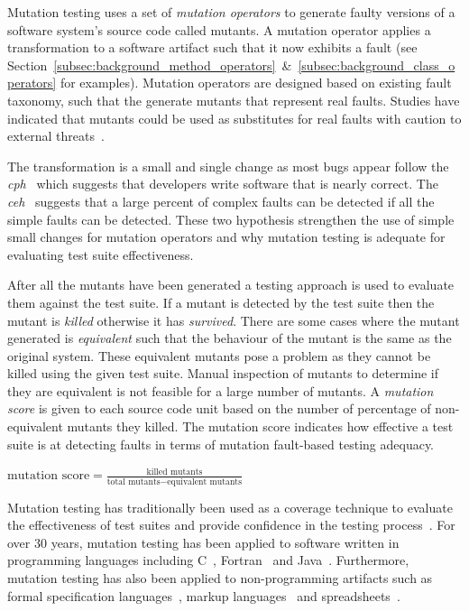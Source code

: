 Mutation testing uses a set of \emph{mutation operators} to generate faulty versions of a software system's source code called mutants. A mutation operator applies a transformation to a software artifact such that it now exhibits a fault (see Section~\ref{subsec:background_method_operators}~\&~\ref{subsec:background_class_operators} for examples). Mutation operators are designed based on existing fault taxonomy, such that the generate mutants that represent real faults. Studies have indicated that mutants could be used as substitutes for real faults with caution to external threats~\cite{ABLN06, NK11}.

The transformation is a small and single change as most bugs appear follow the \emph{\gls{cph}}~\cite{ABD+79} which suggests that developers write software that is nearly correct. The \emph{\gls{ceh}}~\cite{Off92} suggests that a large percent of complex faults can be detected if all the simple faults can be detected. These two hypothesis strengthen the use of simple small changes for mutation operators and why mutation testing is adequate for evaluating test suite effectiveness.

After all the mutants have been generated a testing approach is used to evaluate them against the test suite. If a mutant is detected by the test suite then the mutant is \emph{killed} otherwise it has \emph{survived}. There are some cases where the mutant generated is \emph{equivalent} such that the behaviour of the mutant is the same as the original system. These equivalent mutants pose a problem as they cannot be killed using the given test suite. Manual inspection of mutants to determine if they are equivalent is not feasible for a large number of mutants. A \emph{mutation score} is given to each source code unit based on the number of percentage of non-equivalent mutants they killed. The mutation score indicates how effective a test suite is at detecting faults in terms of mutation fault-based testing adequacy.


\begin{small}
\begin{center}
\emph{$\text{mutation score} = \frac{\text{killed mutants}}{\text{total mutants} - \text{equivalent mutants}}$}
\end{center}
\end{small}

Mutation testing has traditionally been used as a coverage technique to evaluate the effectiveness of test suites and provide confidence in the testing process~\cite{JH10}. For over 30 years, mutation testing has been applied to software written in programming languages including C~\cite{DM96, JH08}, Fortran~\cite{KO91} and Java~\cite{MKO02, BCD06}. Furthermore, mutation testing has also been applied to non-programming artifacts such as formal specification languages~\cite{ABM98}, markup languages~\cite{PO10} and spreadsheets~\cite{AE09}.

